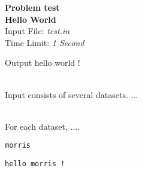 \documentclass[12pt,psfig,epsf]{article}
\begin{document}
\begin{center}
   {\Large\bfseries Problem test}\\			%
   {\large\bf Hello World}\\			%
   {\large Input File: {\em test.in}}\\		%
   {\large Time Limit: {\em 1 Second}}\\	%
\end{center}



Output hello world !



\vspace*{.3in} \\

Input consists of several datasets.  ...

\vspace*{.3in} \\

For each dataset, ....

\vspace*{.3in}  
\begin{verbatim}
morris
\end{verbatim}

\vspace*{.3in} 
\begin{verbatim}
hello morris !
\end{verbatim}
\end{document}

